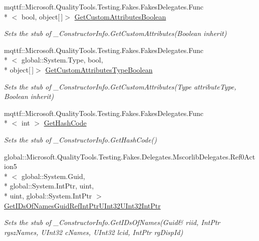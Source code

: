 \begin{DoxyCompactItemize}
mqttf\-::\-Microsoft.\-Quality\-Tools.\-Testing.\-Fakes.\-Fakes\-Delegates.\-Func\\*
$<$ bool, object\mbox{[}$\,$\mbox{]}$>$ \hyperlink{class_system_1_1_runtime_1_1_interop_services_1_1_fakes_1_1_stub___constructor_info_a281e0e5eb490bf988d9ccc7660a5183d}{Get\-Custom\-Attributes\-Boolean}
\begin{DoxyCompactList}\small\item\em Sets the stub of \-\_\-\-Constructor\-Info.\-Get\-Custom\-Attributes(\-Boolean inherit)\end{DoxyCompactList}\item 
mqttf\-::\-Microsoft.\-Quality\-Tools.\-Testing.\-Fakes.\-Fakes\-Delegates.\-Func\\*
$<$ global\-::\-System.\-Type, bool, \\*
object\mbox{[}$\,$\mbox{]}$>$ \hyperlink{class_system_1_1_runtime_1_1_interop_services_1_1_fakes_1_1_stub___constructor_info_a0fdad7078bceb3c6b8b0567ba09f08c8}{Get\-Custom\-Attributes\-Type\-Boolean}
\begin{DoxyCompactList}\small\item\em Sets the stub of \-\_\-\-Constructor\-Info.\-Get\-Custom\-Attributes(\-Type attribute\-Type, Boolean inherit)\end{DoxyCompactList}\item 
mqttf\-::\-Microsoft.\-Quality\-Tools.\-Testing.\-Fakes.\-Fakes\-Delegates.\-Func\\*
$<$ int $>$ \hyperlink{class_system_1_1_runtime_1_1_interop_services_1_1_fakes_1_1_stub___constructor_info_aa6af78dcd82d9820086a409c705e59f6}{Get\-Hash\-Code}
\begin{DoxyCompactList}\small\item\em Sets the stub of \-\_\-\-Constructor\-Info.\-Get\-Hash\-Code()\end{DoxyCompactList}\item 
global\-::\-Microsoft.\-Quality\-Tools.\-Testing.\-Fakes.\-Delegates.\-Mscorlib\-Delegates.\-Ref0\-Action5\\*
$<$ global\-::\-System.\-Guid, \\*
global\-::\-System.\-Int\-Ptr, uint, \\*
uint, global\-::\-System.\-Int\-Ptr $>$ \hyperlink{class_system_1_1_runtime_1_1_interop_services_1_1_fakes_1_1_stub___constructor_info_a6fd4e3405c6146a6931ed93993303826}{Get\-I\-Ds\-Of\-Names\-Guid\-Ref\-Int\-Ptr\-U\-Int32\-U\-Int32\-Int\-Ptr}
\begin{DoxyCompactList}\small\item\em Sets the stub of \-\_\-\-Constructor\-Info.\-Get\-I\-Ds\-Of\-Names(Guid\& riid, Int\-Ptr rgsz\-Names, U\-Int32 c\-Names, U\-Int32 lcid, Int\-Ptr rg\-Disp\-Id)\end{DoxyCompactList}\item 

\end{DoxyCompactItemize}
